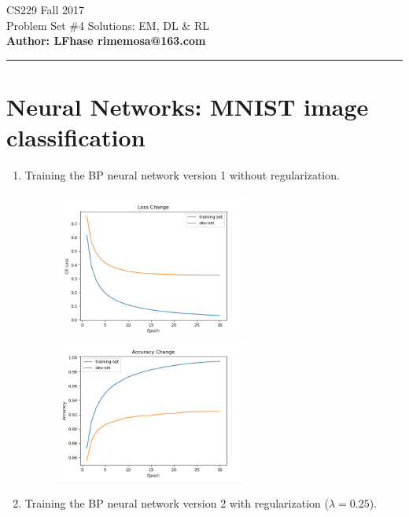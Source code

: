 \documentclass[12pt]{article}
\begin{document}
    \begin{flushleft}
    \LARGE CS229 Fall 2017\\
    \LARGE Problem Set \#4 Solutions:  EM, DL \& RL \\
    \textbf{\normalsize Author: LFhase \quad rimemosa@163.com}
    \end{flushleft} 
    \noindent
    \rule{\linewidth}{0.4pt}

    \section*{Neural Networks: MNIST image classification}
    \begin{enumerate}[label=(\alph*)]
        \item Training the BP neural network version 1 without regularization.
        \begin{figure}[h]
            \begin{minipage}[h]{0.5\linewidth}
                \centering
                \includegraphics[width=2.5in]{Q1/loss_v1.png}
            \end{minipage}%
            \begin{minipage}[h]{0.5\linewidth}
                \centering
                \includegraphics[width=2.5in]{Q1/acc_v1.png}
            \end{minipage}
        \end{figure}
        \item Training the BP neural network version 2 with regularization ($\lambda = 0.25$).

\end{enumerate}
\end{document}

